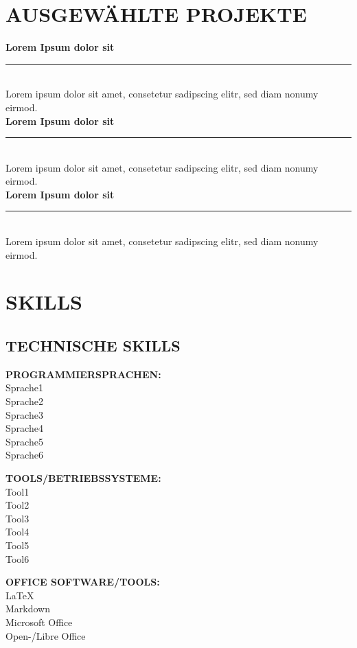 \documentclass{article}
\begin{document}
    \section*{\MakeUppercase{Ausgewählte Projekte}}
        \textbf{Lorem Ipsum dolor sit}\vspace{-1em}\\
        \noindent\rule{.05\textwidth}{1pt}\\
        Lorem ipsum dolor sit amet, consetetur sadipscing elitr, sed diam nonumy eirmod. \\

        \textbf{Lorem Ipsum dolor sit}\vspace{-1em}\\
        \noindent\rule{.05\textwidth}{1pt}\\
        Lorem ipsum dolor sit amet, consetetur sadipscing elitr, sed diam nonumy eirmod.\\
        
        \textbf{Lorem Ipsum dolor sit}\vspace{-1em}\\
        \noindent\rule{.05\textwidth}{1pt}\\
        Lorem ipsum dolor sit amet, consetetur sadipscing elitr, sed diam nonumy eirmod.

    \newpage
    \section*{\MakeUppercase{Skills}}
    \subsection*{\MakeUppercase{Technische Skills}}
    \begin{minipage}[t]{.33\textwidth}
        \textbf{\MakeUppercase{Programmiersprachen:}}\\
        Sprache1\\
        Sprache2\\
        Sprache3\\
        Sprache4\\
        Sprache5\\
        Sprache6
    \end{minipage}
    \begin{minipage}[t]{.33\textwidth}
        \textbf{\MakeUppercase{Tools/Betriebssysteme:}}\\
        Tool1\\
        Tool2\\
        Tool3\\
        Tool4\\
        Tool5\\
        Tool6
    \end{minipage}
    \begin{minipage}[t]{.33\textwidth}
        \textbf{\MakeUppercase{Office Software/Tools:}}\\
        {\selectfont \LaTeX}\\
        Markdown\\
        Microsoft Office\\
        Open-/Libre Office
    \end{minipage}
\end{document}
